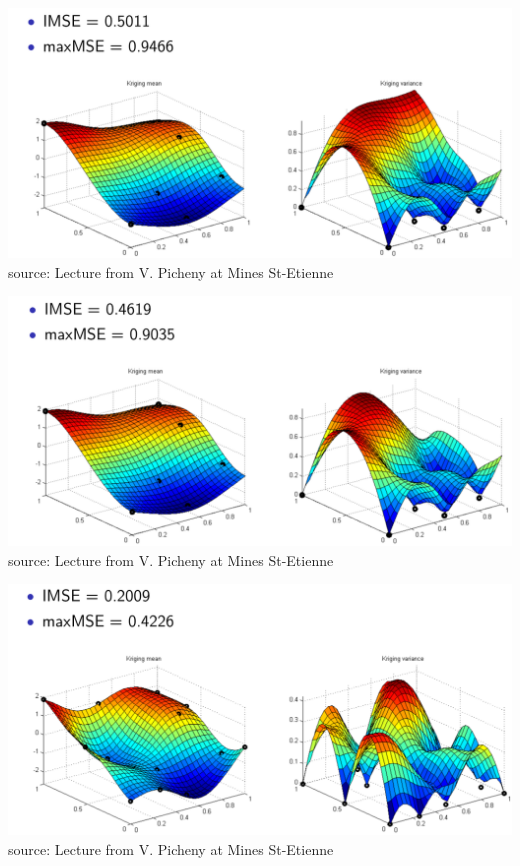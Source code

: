 \begin{frame}{}
\vspace{5mm}
\includegraphics[width=\textwidth]{2_Design_of_experiments/figures/adaptative3}\\
\vfill
source: Lecture from V. Picheny at Mines St-Etienne
\end{frame}

\begin{frame}{}
\vspace{5mm}
\includegraphics[width=\textwidth]{2_Design_of_experiments/figures/adaptative4}\\
\vfill
source: Lecture from V. Picheny at Mines St-Etienne
\end{frame}

\begin{frame}{}
\vspace{5mm}
\includegraphics[width=\textwidth]{2_Design_of_experiments/figures/adaptative6}\\
\vfill
source: Lecture from V. Picheny at Mines St-Etienne
\end{frame}

